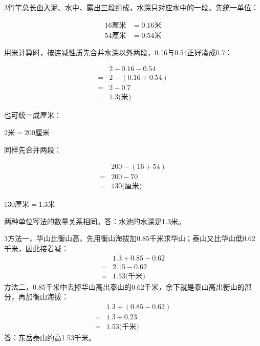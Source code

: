 \documentclass[multi=snippet,border={5bp 20bp 5bp 5bp}]{standalone}
\newenvironment{snippet}[3]{\begin{minipage}{#1bp}\color{answerred}\fontsize{#2}{#3}\selectfont\raggedright}{\end{minipage}}
\begin{document}
\begin{snippet}{505}{11.5}{14}\begin{multicols}{3}\raggedcolumns 竹竿总长由入泥、水中、露出三段组成，水深只对应水中的一段。先统一单位：\par\noindent\[\displaystyle \begin{aligned}16\text{厘米}&=0.16\text{米}\\54\text{厘米}&=0.54\text{米}\end{aligned}\]\par 用米计算时，按连减性质先合并水深以外两段，0.16与0.54正好凑成0.7：\par\noindent\[\displaystyle \begin{aligned}&2-0.16-0.54\\={}&2-(0.16+0.54)\\={}&2-0.7\\={}&1.3\text{(米)}\end{aligned}\]\par 也可统一成厘米：\par\noindent\(\displaystyle 2\text{米}=200\text{厘米}\)\allowbreak \par 同样先合并两段：\par\noindent\[\displaystyle \begin{aligned}&200-(16+54)\\={}&200-70\\={}&130\text{(厘米)}\end{aligned}\]\par \noindent\(\displaystyle 130\text{厘米}=1.3\text{米}\)\allowbreak \par 两种单位写法的数量关系相同。答：水池的水深是1.3米。\end{multicols}\end{snippet}
\begin{snippet}{505}{11.5}{14}\begin{multicols}{3}\raggedcolumns 方法一，华山比衡山高，先用衡山海拔加0.85千米求华山；泰山又比华山低0.62千米，因此接着减：\[\begin{aligned}&1.3+0.85-0.62\\={}&2.15-0.62\\={}&1.53\text{(千米)}\end{aligned}\]方法二，0.85千米中去掉华山高出泰山的0.62千米，余下就是泰山高出衡山的部分，再加衡山海拔：\[\begin{aligned}&1.3+(0.85-0.62)\\={}&1.3+0.23\\={}&1.53\text{(千米)}\end{aligned}\]答：东岳泰山约高1.53千米。\end{multicols}\end{snippet}
\end{document}
